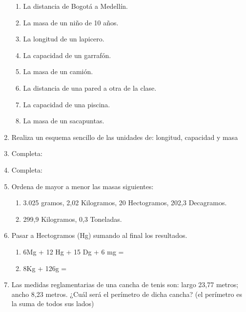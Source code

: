 \documentclass[twoside]{article}
\begin{document}
\begin{enumerate}
\begin{enumerate}
\item La distancia de Bogotá a Medellín.
\item La masa de un niño de 10 años.
\item La longitud de un lapicero.
\item La capacidad de un garrafón.
\item La masa de un camión.
\item La distancia de una pared a otra de la clase.
\item La capacidad de una piscina.
\item La masa de un sacapuntas.
\end{enumerate}
\item Realiza un esquema sencillo de las unidades de: longitud, capacidad y masa
\item Completa:
\begin{enumerate}
\end{enumerate}
\item Completa:
\begin{enumerate}
\end{enumerate}
\item Ordena de mayor a menor las masas siguientes:
\begin{enumerate}
\item 3.025 gramos, 2,02 Kilogramos, 20 Hectogramos, 202,3 Decagramos.
\item 299,9 Kilogramos, 0,3 Toneladas.
\end{enumerate}
\item Pasar a Hectogramos (Hg) sumando al final los resultados.
\begin{enumerate}
\item 6Mg + 12 Hg + 15 Dg + 6 mg =
\item 8Kg  + 126g =
\end{enumerate}
\item Las medidas reglamentarias de una cancha de tenis son: largo 23,77 metros; ancho 8,23 metros. ¿Cuál será el perímetro de dicha cancha? (el perímetro es la suma de todos sus lados)

\end{enumerate}
\end{document}
